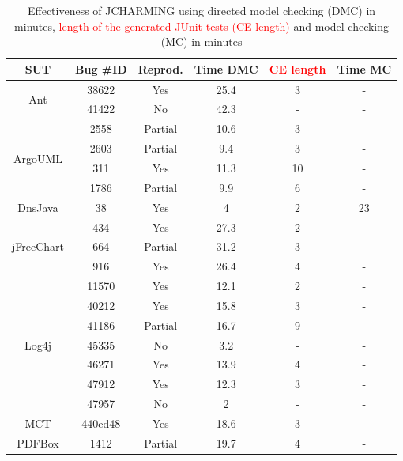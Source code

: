 \documentclass[times, doublespace]{smrauth}
\newcommand{\red}[1]{\textcolor{red}{#1}}
\begin{document}
{\begin{table}[H]
\centering
\caption{Effectiveness of JCHARMING using directed model checking (DMC) in minutes, \red{length of the generated JUnit tests (CE length)} and model checking (MC) in minutes}
\begin{tabular}{c|c|c|c|c|c}
SUT                         & Bug \#ID & Reprod. & Time DMC & \red{CE length} & Time MC \\ \hline \hline
\multirow{2}{*}{Ant}        & 38622    & Yes     & 25.4   & 3  & -       \\
                            & 41422    & No      & 42.3   & -  & -       \\ \hline
\multirow{4}{*}{ArgoUML}    & 2558     & Partial & 10.6   & 3  & -       \\
                            & 2603     & Partial & 9.4    & 3  & -       \\
                            & 311      & Yes     & 11.3   & 10  & -       \\
                            & 1786     & Partial & 9.9    & 6  & -       \\  \hline
DnsJava                     & 38       & Yes     & 4      & 2  & 23      \\ \hline
\multirow{3}{*}{jFreeChart} & 434      & Yes     & 27.3   & 2  & -       \\
                            & 664      & Partial & 31.2   & 3   & -       \\
                            & 916      & Yes     & 26.4   & 4  & -       \\ \hline
\multirow{7}{*}{Log4j}      & 11570    & Yes     & 12.1   & 2  & -       \\
                            & 40212    & Yes     & 15.8   & 3  & -       \\
                            & 41186    & Partial & 16.7   & 9  & -       \\
                            & 45335    & No      & 3.2    & -  & -       \\
                            & 46271    & Yes     & 13.9   & 4  & -       \\
                            & 47912    & Yes     & 12.3   & 3  & -       \\
                            & 47957    & No      & 2      & -  & -       \\ \hline
MCT                         & 440ed48  & Yes     & 18.6   & 3  & -       \\ \hline
\multirow{2}{*}{PDFBox}     & 1412     & Partial & 19.7   & 4  & -       \\

\end{tabular}
\end{table}}
\end{document}
